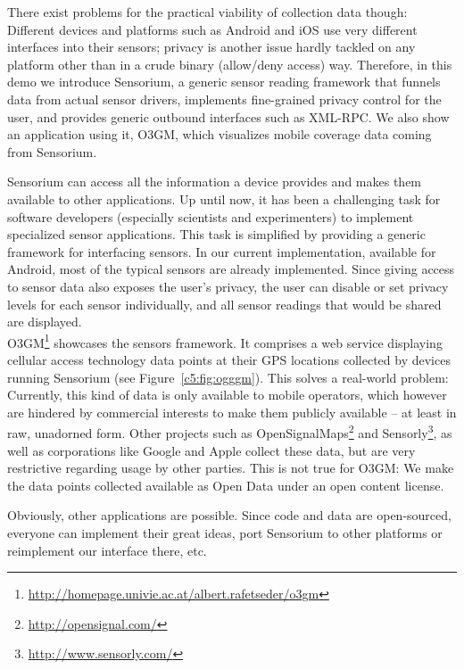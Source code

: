 There exist problems for the practical viability of collection data though: Different devices and platforms such as Android and iOS use very different interfaces into their sensors; privacy is another issue hardly tackled on any platform other than in a crude binary (allow/deny access) way. Therefore, in this demo we introduce Sensorium, a generic sensor reading framework that funnels data from actual sensor drivers, implements fine-grained privacy control for the user, and provides generic outbound interfaces such as XML-RPC. We also show an application using it, O3GM, which visualizes mobile coverage data coming from Sensorium.

Sensorium can access all the information a device provides and makes them available to other applications. Up until now, it has been a challenging task for software developers (especially scientists and experimenters) to implement specialized sensor applications. This task is simplified by providing a generic framework for interfacing sensors. In our current implementation, available for Android, most of the typical sensors are already implemented. Since giving access to sensor data also exposes the user's privacy, the user can disable or set privacy levels for each sensor individually, and all sensor readings that would be shared are displayed. %
\\

O3GM\footnote{\url{http://homepage.univie.ac.at/albert.rafetseder/o3gm}} showcases the sensors framework. It comprises a web service displaying cellular access technology data points at their GPS locations collected by devices running Sensorium (see Figure~\ref{c5:fig:ogggm}). This solves a real-world problem: Currently, this kind of data is only available to mobile operators, which however  are hindered by commercial interests to make them publicly available -- at least in raw, unadorned form. Other projects such as OpenSignalMaps\footnote{\url{http://opensignal.com/}} and Sensorly\footnote{\url{http://www.sensorly.com/}}, as well as corporations like Google and Apple collect these data, but are very restrictive regarding usage by other parties. This is not true for O3GM: We make the data points collected available as Open Data under an open content license.

Obviously, other applications are possible. Since code and data are open-sourced, everyone can implement their great ideas, port Sensorium to other platforms or reimplement our interface there, etc.

